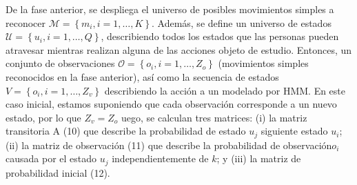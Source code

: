\documentclass[10pt]{article}
\begin{document}
De la fase anterior, se despliega el universo de posibles movimientos simples a reconocer $\mathcal{M}=\left\{m_{i}, i=1, \ldots, K\right\}$. Además, se define un universo de estados $\mathcal{U}=\left\{u_{i}, i=1, \ldots, Q\right\}$,  describiendo todos los estados que las personas pueden atravesar mientras realizan alguna de las acciones objeto de estudio. Entonces, un conjunto de observaciones $\mathcal{O}=\left\{o_{i}, i=1, \ldots, Z_{o}\right\}$ (movimientos simples reconocidos en la fase anterior), así como la secuencia de estados $V=\left\{o_{i}, i=1, \ldots, Z_{v}\right\}$ describiendo la acción a un modelado por HMM. En este caso inicial, estamos suponiendo que cada observación corresponde a un nuevo estado, por lo que  $Z_{v}=Z_{o}$ uego, se calculan tres matrices: (i) la matriz transitoria  A (10) que describe la probabilidad de estado $u_{j}$ siguiente estado $u_{i}$; (ii) la matriz de observación (11) que describe la probabilidad de observación$o_{i}$ causada por el estado $u_{j}$ independientemente de $k$; y (iii) la matriz de probabilidad inicial (12).
\end{document}
